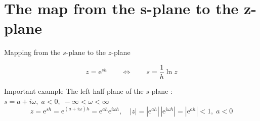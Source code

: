 \documentclass[presentation,aspectratio=169]{beamer}
\begin{document}
\section{The map from the s-plane to the z-plane}
\label{sec:org787e461}
\begin{frame}[label={sec:org59c7520}]{Mapping from the \(s\)-plane to the \(z\)-plane}
\begin{tcolorbox}
\[ z = \mathrm{e}^{sh} \qquad \Leftrightarrow \qquad  s = \frac{1}{h} \ln z\]
\end{tcolorbox}

\alert{Important example} The left half-plane of the \(s\)-plane : \(s = a + i\omega, \; a < 0, \; -\infty < \omega < \infty\)
\[ z = \mathrm{e}^{sh} = \mathrm{e}^{(a + i\omega)h} = \mathrm{e}^{ah} \mathrm{e}^{i\omega h}, \quad |z| = |\mathrm{e}^{ah}|\, |\mathrm{e}^{i\omega h}| = |\mathrm{e}^{ah}| < 1, \; a < 0\]
\end{frame}
\end{document}

